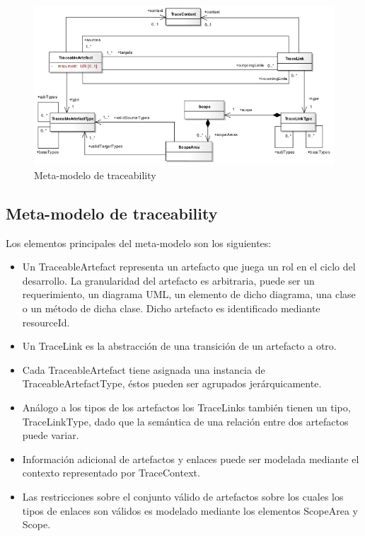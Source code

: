 \documentclass[a4paper,12pt,oneside]{book}
\begin{document}
\begin{figure}[hbtp]
\centering
\includegraphics[scale=.6]{./img/Traceability_Metamodel}
\caption{Meta-modelo de traceability}
\label{fig:SPLMeta-modelo}
\end{figure}

\subsection{Meta-modelo de traceability}

Los elementos principales del meta-modelo son los siguientes:

\begin{itemize}
\item     Un TraceableArtefact representa un artefacto que juega un rol en el ciclo del desarrollo. La granularidad del artefacto es arbitraria, puede ser un requerimiento, un diagrama UML, un elemento de dicho diagrama, una clase o un método de dicha clase. Dicho artefacto es identificado mediante resourceId.
\item    Un TraceLink es la abstracción de una transición de un artefacto a otro.
\item    Cada TraceableArtefact tiene asignada una instancia de TraceableArtefactType, éstos pueden ser agrupados jerárquicamente.
 \item   Análogo a los tipos de los artefactos los TraceLinks también tienen un tipo, TraceLinkType, dado que la semántica de una relación entre dos artefactos puede variar.
\item    Información adicional de artefactos y enlaces puede ser modelada mediante el contexto representado por TraceContext.
\item    Las restricciones sobre el conjunto válido de artefactos sobre los cuales los tipos de enlaces son válidos es modelado mediante los elementos ScopeArea y Scope.
\end{itemize}
\end{document}
